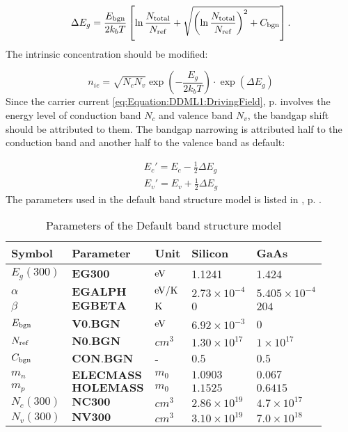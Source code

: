\documentclass[oneside,12pt]{cgd_book}
\begin{document}
\par
\begin{equation}
\Delta E_g = \frac{E_{\rm bgn}}{2k_b T}\left[ \ln \frac{N_{\rm total}}{N_{\rm ref}} + \sqrt {\left(
        \ln \frac{N_{\rm total}}{N_{\rm ref}} \right)^2 + C_{\rm bgn}} \right].
\end{equation}
The intrinsic concentration should be modified:
\par
\begin{equation}
n_{ie}=\sqrt{N_c N_v } \exp\left(-\frac{E_g}{2 k_b T} \right) \cdot \exp(\Delta E_g)
\end{equation}
Since the carrier current \eqref{eq:Equation:DDML1:DrivingField},
p. \pageref{eq:Equation:DDML1:DrivingField} involves the energy level of
      conduction band $N_{c}$ and valence band $N_{v}$, the
      bandgap shift should be attributed to them. The bandgap narrowing is attributed half to the conduction band and
      another half to the valence band as default:
\par
\begin{subequations}
\begin{align}
 E_c'  =E_c-\frac{1}{2}\Delta E_g \\
 E_v'  =E_v+\frac{1}{2}\Delta E_g
\end{align}
\end{subequations}
The parameters used in the default band structure model is listed in
, p. \pageref{tab:Equation:Band:Default:Param}.
\par
\begin{longtable}{lllll}
\caption{\label{tab:Equation:Band:Default:Param}Parameters of the Default band structure model}
\\
\hline
 Symbol
& Parameter
& Unit
& Silicon
& GaAs\\
\hline
$E_g(300)$
& $\mathbf{EG300}$
& $\text{eV}$
& 1.1241
& 1.424
\\
 $\alpha$
& $\mathbf{EGALPH}$
& $\text{eV}\text{/}\text{K}$
& $2.73\times10^{-4}$
& $5.405\times10^{-4}$
\\
 $\beta$
& $\mathbf{EGBETA}$
& $\text{K}$
& $0$
& $204$
\\
 $E_{\rm bgn}$
& $\mathbf{V0.BGN}$
& $\text{eV}$
& $6.92\times10^{-3}$
& 0
\\
 $N_{\rm ref}$
& $\mathbf{N0.BGN}$
& $cm^3$
& $1.30\times10^{17}$
& $1\times10^{17}$
\\
 $C_{\rm bgn}$
& $\mathbf{CON.BGN}$
& -
& $0.5$
& $0.5$
\\
 $m_n$
& $\mathbf{ELECMASS}$
& $m_0$
& $1.0903$
& $0.067$
\\
 $m_p$
& $\mathbf{HOLEMASS}$
& $m_0$
& $1.1525$
& $0.6415$
\\
 $N_c(300)$
& $\mathbf{NC300}$
& $cm^3$
& $2.86\times10^{19}$
& $4.7\times10^{17}$
\\
 $N_v(300)$
& $\mathbf{NV300}$
& $cm^3$
& $3.10\times10^{19}$
& $7.0\times10^{18}$\\
\end{longtable}
\end{document}
